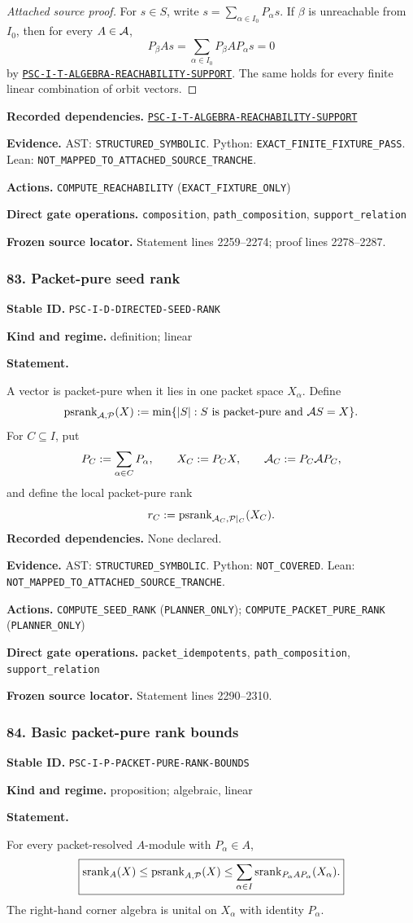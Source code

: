 \documentclass[a4paper,11pt]{article}
\newcommand{\field}[2]{\noindent\textbf{#1.} #2\par}
\begin{document}
\begin{proof}[Attached source proof]
For $s\in S$, write $s=\sum_{\alpha\in I_0}P_\alpha s$.  If $\beta$ is unreachable from $I_0$, then for every $A\in\mathcal A$,
\[
P_\beta As
=
\sum_{\alpha\in I_0}P_\beta AP_\alpha s
=0
\]
by \hyperref[rec:PSC-I-T-ALGEBRA-REACHABILITY-SUPPORT]{\nolinkurl{PSC-I-T-ALGEBRA-REACHABILITY-SUPPORT}}.  The same holds for every finite linear combination of orbit vectors.
\end{proof}
\field{Recorded dependencies}{\hyperref[rec:PSC-I-T-ALGEBRA-REACHABILITY-SUPPORT]{\nolinkurl{PSC-I-T-ALGEBRA-REACHABILITY-SUPPORT}}}
\field{Evidence}{AST: \nolinkurl{STRUCTURED_SYMBOLIC}. Python: \nolinkurl{EXACT_FINITE_FIXTURE_PASS}. Lean: \nolinkurl{NOT_MAPPED_TO_ATTACHED_SOURCE_TRANCHE}.}
\field{Actions}{\nolinkurl{COMPUTE_REACHABILITY} (\nolinkurl{EXACT_FIXTURE_ONLY})}
\field{Direct gate operations}{\nolinkurl{composition}, \nolinkurl{path_composition}, \nolinkurl{support_relation}}
\field{Frozen source locator}{Statement lines 2259--2274; proof lines 2278--2287.}
\subsubsection*{83. Packet-pure seed rank}
\label{rec:PSC-I-D-DIRECTED-SEED-RANK}
\field{Stable ID}{\nolinkurl{PSC-I-D-DIRECTED-SEED-RANK}}
\field{Kind and regime}{definition; linear}
\textbf{Statement.}\par
A vector is packet-pure when it lies in one packet space $X_\alpha$.  Define
\[
\operatorname{psrank}_{\mathcal A,\mathcal P}(X)
:=
\min\{|S|:S\text{ is packet-pure and }\mathcal A S=X\}.
\]
For $C\subseteq I$, put
\[
P_C:=\sum_{\alpha\in C}P_\alpha,
\qquad
X_C:=P_CX,
\qquad
\mathcal A_C:=P_C\mathcal A P_C,
\]
and define the local packet-pure rank
\[
r_C:=\operatorname{psrank}_{\mathcal A_C,\mathcal P|_C}(X_C).
\]
\field{Recorded dependencies}{None declared.}
\field{Evidence}{AST: \nolinkurl{STRUCTURED_SYMBOLIC}. Python: \nolinkurl{NOT_COVERED}. Lean: \nolinkurl{NOT_MAPPED_TO_ATTACHED_SOURCE_TRANCHE}.}
\field{Actions}{\nolinkurl{COMPUTE_SEED_RANK} (\nolinkurl{PLANNER_ONLY}); \nolinkurl{COMPUTE_PACKET_PURE_RANK} (\nolinkurl{PLANNER_ONLY})}
\field{Direct gate operations}{\nolinkurl{packet_idempotents}, \nolinkurl{path_composition}, \nolinkurl{support_relation}}
\field{Frozen source locator}{Statement lines 2290--2310.}
\subsubsection*{84. Basic packet-pure rank bounds}
\label{rec:PSC-I-P-PACKET-PURE-RANK-BOUNDS}
\field{Stable ID}{\nolinkurl{PSC-I-P-PACKET-PURE-RANK-BOUNDS}}
\field{Kind and regime}{proposition; algebraic, linear}
\textbf{Statement.}\par
For every packet-resolved $A$-module with $P_\alpha\in A$,
\[
\boxed{
\operatorname{srank}_A(X)
\leq
\operatorname{psrank}_{A,\mathcal P}(X)
\leq
\sum_{\alpha\in I}
\operatorname{srank}_{P_\alpha A P_\alpha}(X_\alpha).
}
\]
The right-hand corner algebra is unital on $X_\alpha$ with identity $P_\alpha$.
\end{document}
